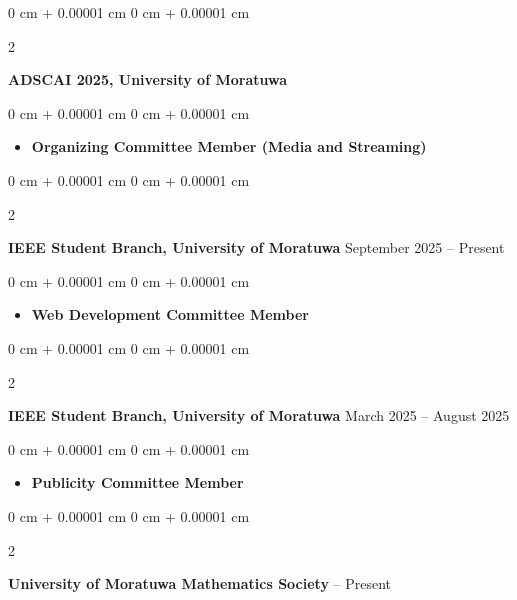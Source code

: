 \documentclass[10pt, letterpaper]{article}
\newenvironment{highlights}{
    \begin{itemize}[
        topsep=0.10 cm,
        parsep=0.10 cm,
        partopsep=0pt,
        itemsep=0pt,
        leftmargin=0 cm + 10pt
    ]
}{
    \end{itemize}
} %
\newenvironment{onecolentry}{
    \begin{adjustwidth}{
        0 cm + 0.00001 cm
    }{
        0 cm + 0.00001 cm
    }
}{
    \end{adjustwidth}
} %
\newenvironment{twocolentry}[2][]{
    \onecolentry
    \def\secondColumn{#2}
    \setcolumnwidth{\fill, 4.5 cm}
    \begin{paracol}{2}
}{
    \switchcolumn \raggedleft \secondColumn
    \end{paracol}
    \endonecolentry
} %
\begin{document}
        \vspace{0.30 cm}
        \begin{twocolentry}{
            2025
        }
            \textbf{ADSCAI 2025, University of Moratuwa}\end{twocolentry}

        \vspace{0.10 cm}
        \begin{onecolentry}
            \begin{highlights}
                \item \textbf{Organizing Committee Member (Media and Streaming)}
            \end{highlights}
        \end{onecolentry}

        \vspace{0.30 cm}
        \begin{twocolentry}{
            September 2025 – Present
        }
            \textbf{IEEE Student Branch, University of Moratuwa}\end{twocolentry}

        \vspace{0.10 cm}
        \begin{onecolentry}
            \begin{highlights}
                \item \textbf{Web Development Committee Member}
            \end{highlights}
        \end{onecolentry}

        \vspace{0.30 cm}
        \begin{twocolentry}{
            March 2025 – August 2025
        }
            \textbf{IEEE Student Branch, University of Moratuwa}\end{twocolentry}

        \vspace{0.10 cm}
        \begin{onecolentry}
            \begin{highlights}
                \item \textbf{Publicity Committee Member}
            \end{highlights}
        \end{onecolentry}

        \vspace{0.30 cm}
        \begin{twocolentry}{
            2024 – Present
        }
            \textbf{University of Moratuwa Mathematics Society}\end{twocolentry}
\end{document}

